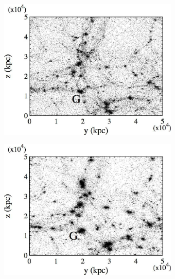 \documentclass{article}
\begin{document}
\begin{figure}
     \centering
     \begin{subfigure}[b]{0.45\textwidth}
         \centering
         \includegraphics[width=\textwidth]{images/1a.PNG}
         \caption{}
         \label{fig:1a}
     \end{subfigure}
     \hfill
     \begin{subfigure}[b]{0.45\textwidth}
         \centering
         \includegraphics[width=\textwidth]{images/1b.PNG}
         \caption{}
         \label{fig:1b}
     \end{subfigure}
     \hfill
     \begin{subfigure}[b]{0.45\textwidth}

\end{subfigure}
\end{figure}
\end{document}
